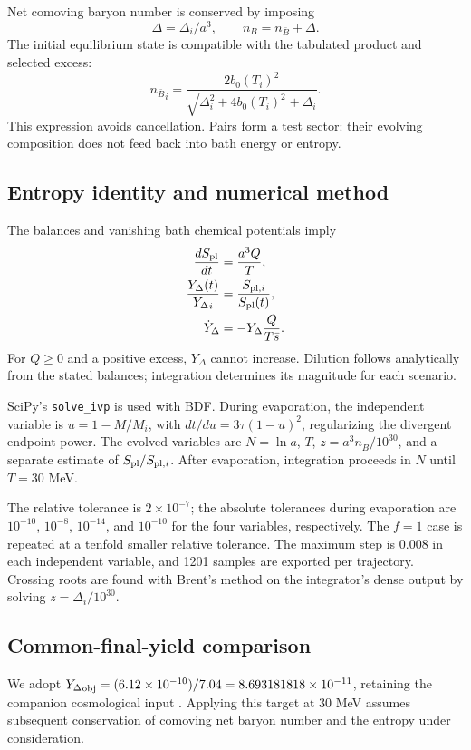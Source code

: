 \documentclass[10pt,a4paper,twocolumn]{article}
\newcommand{\nb}{{n_{\bar B}}}
\newcommand{\Y}{{Y_\Delta}}
\newcommand{\sbar}{\bar s}
\begin{document}
Net comoving baryon number is conserved by imposing
\begin{equation}\label{eq:net}
\Delta=\Delta_i/a^3,\qquad n_B=\nb+\Delta.
\end{equation}
The initial equilibrium state is compatible with the tabulated product and selected excess:
\begin{equation}
\nb_i=\frac{2b_0(T_i)^2}{\sqrt{\Delta_i^2+4b_0(T_i)^2}+\Delta_i}.
\end{equation}
This expression avoids cancellation. Pairs form a test sector: their evolving composition does not feed back into bath energy or entropy.

\subsection{Entropy identity and numerical method}
The balances and vanishing bath chemical potentials imply
\begin{align}
\frac{dS_{\rm pl}}{dt}&=\frac{a^3Q}{T},\\
\frac{\Y(t)}{\Y_i}&=\frac{S_{{\rm pl},i}}{S_{\rm pl}(t)},\label{eq:dil}\\
\dot Y_\Delta&=-\Y\frac{Q}{T\sbar}.
\end{align}
For $Q\geq0$ and a positive excess, $\Y$ cannot increase. Dilution follows analytically from the stated balances; integration determines its magnitude for each scenario.

SciPy's \texttt{solve\_ivp} is used with BDF. During evaporation, the independent variable is $u=1-M/M_i$, with $dt/du=3\tau(1-u)^2$, regularizing the divergent endpoint power. The evolved variables are $N=\ln a$, $T$, $z=a^3\nb/10^{30}$, and a separate estimate of $S_{\rm pl}/S_{{\rm pl},i}$. After evaporation, integration proceeds in $N$ until $T=30$ MeV.

The relative tolerance is $2\times10^{-7}$; the absolute tolerances during evaporation are $10^{-10}$, $10^{-8}$, $10^{-14}$, and $10^{-10}$ for the four variables, respectively. The $f=1$ case is repeated at a tenfold smaller relative tolerance. The maximum step is 0.008 in each independent variable, and 1201 samples are exported per trajectory. Crossing roots are found with Brent's method on the integrator's dense output by solving $z=\Delta_i/10^{30}$.

\subsection{Common-final-yield comparison}
We adopt $\Y_{\rm obj}=(6.12\times10^{-10})/7.04=8.693181818\times10^{-11}$, retaining the companion cosmological input \cite{garcia,pdg}. Applying this target at 30 MeV assumes subsequent conservation of comoving net baryon number and the entropy under consideration.
\end{document}
